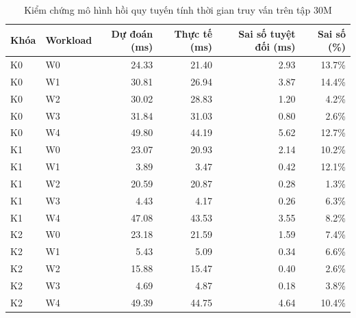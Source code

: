 \begin{table}[htbp]
\centering
\caption{Kiểm chứng mô hình hồi quy tuyến tính thời gian truy vấn trên tập 30M}
\label{tab:model_validation}
\begin{tabular}{llrrrr}
\toprule
\textbf{Khóa} & \textbf{Workload} & \textbf{Dự đoán (ms)} & \textbf{Thực tế (ms)} & \textbf{Sai số tuyệt đối (ms)} & \textbf{Sai số (\%)} \\
\midrule
    K0 & W0 & 24.33 & 21.40 & 2.93 & 13.7\% \\
    K0 & W1 & 30.81 & 26.94 & 3.87 & 14.4\% \\
    K0 & W2 & 30.02 & 28.83 & 1.20 & 4.2\% \\
    K0 & W3 & 31.84 & 31.03 & 0.80 & 2.6\% \\
    K0 & W4 & 49.80 & 44.19 & 5.62 & 12.7\% \\
    K1 & W0 & 23.07 & 20.93 & 2.14 & 10.2\% \\
    K1 & W1 & 3.89 & 3.47 & 0.42 & 12.1\% \\
    K1 & W2 & 20.59 & 20.87 & 0.28 & 1.3\% \\
    K1 & W3 & 4.43 & 4.17 & 0.26 & 6.3\% \\
    K1 & W4 & 47.08 & 43.53 & 3.55 & 8.2\% \\
    K2 & W0 & 23.18 & 21.59 & 1.59 & 7.4\% \\
    K2 & W1 & 5.43 & 5.09 & 0.34 & 6.6\% \\
    K2 & W2 & 15.88 & 15.47 & 0.40 & 2.6\% \\
    K2 & W3 & 4.69 & 4.87 & 0.18 & 3.8\% \\
    K2 & W4 & 49.39 & 44.75 & 4.64 & 10.4\% \\
\bottomrule
\end{tabular}
\end{table}
